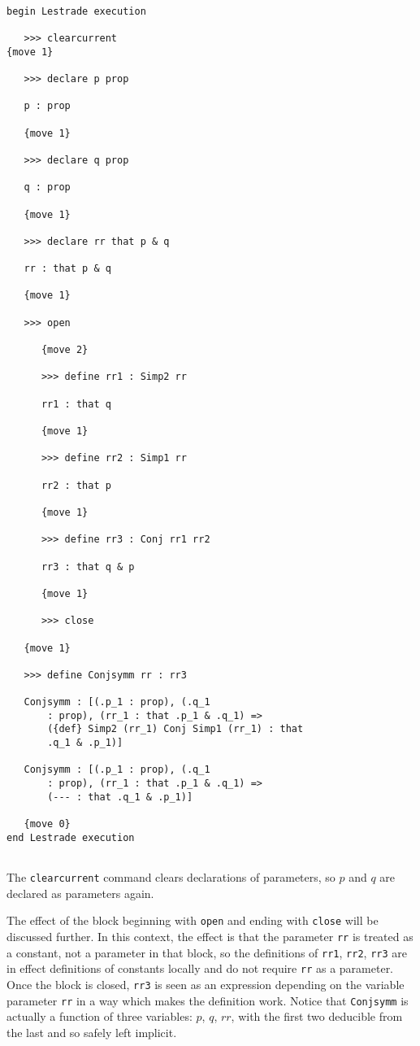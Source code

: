 \documentclass[12pt]{article}
\begin{document}
\begin{verbatim}

begin Lestrade execution

   >>> clearcurrent
{move 1}

   >>> declare p prop

   p : prop

   {move 1}

   >>> declare q prop

   q : prop

   {move 1}

   >>> declare rr that p & q

   rr : that p & q

   {move 1}

   >>> open

      {move 2}

      >>> define rr1 : Simp2 rr

      rr1 : that q

      {move 1}

      >>> define rr2 : Simp1 rr

      rr2 : that p

      {move 1}

      >>> define rr3 : Conj rr1 rr2

      rr3 : that q & p

      {move 1}

      >>> close

   {move 1}

   >>> define Conjsymm rr : rr3

   Conjsymm : [(.p_1 : prop), (.q_1 
       : prop), (rr_1 : that .p_1 & .q_1) => 
       ({def} Simp2 (rr_1) Conj Simp1 (rr_1) : that 
       .q_1 & .p_1)]

   Conjsymm : [(.p_1 : prop), (.q_1 
       : prop), (rr_1 : that .p_1 & .q_1) => 
       (--- : that .q_1 & .p_1)]

   {move 0}
end Lestrade execution


\end{verbatim}

The {\tt clearcurrent} command clears declarations of parameters, so $p$ and $q$ are declared as parameters again.

The effect of the block beginning with {\tt open} and ending with {\tt close} will be discussed further.  In this context, the effect is that the parameter {\tt rr} is treated as a constant, not a parameter in that block, so the definitions 
of {\tt rr1}, {\tt rr2}, {\tt rr3} are in effect definitions of constants locally and do not require {\tt rr} as a parameter.
Once the block is closed, {\tt rr3} is seen as an expression depending on the variable parameter {\tt rr} in a way which makes the definition work.  Notice that {\tt Conjsymm} is actually a function of three variables:  $p$, $q$, $rr$, with the first two deducible from the last and so safely left implicit.
\end{document}
